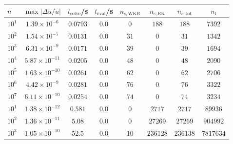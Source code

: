 \begin{tabular}{l c c c c c c c}
\hline \hline 
$n$  &  $\max|\Delta u/u|$  &  $t_{\mathrm{solve}}$/\si{\s}  &  $t_{\mathrm{eval}}$/\si{\s}  &  $n_{\mathrm{s,WKB}}$  &  $n_{\mathrm{s,RK}}$  &  $n_{\mathrm{s,tot}}$  &  $n_{\mathrm{f}}$  \\ \hline
$10^1$  &  $1.39 \times 10^{-6}$  &  $0.0793$  &  $0.0$  &  $0$  &  $188$  &  $188$  &  $7392$  \\ 
$10^2$  &  $1.54 \times 10^{-7}$  &  $0.0131$  &  $0.0$  &  $31$  &  $0$  &  $31$  &  $1342$  \\ 
$10^3$  &  $6.31 \times 10^{-9}$  &  $0.0171$  &  $0.0$  &  $39$  &  $0$  &  $39$  &  $1694$  \\ 
$10^4$  &  $5.87 \times 10^{-11}$  &  $0.0205$  &  $0.0$  &  $48$  &  $0$  &  $48$  &  $2090$  \\ 
$10^5$  &  $1.63 \times 10^{-10}$  &  $0.0261$  &  $0.0$  &  $62$  &  $0$  &  $62$  &  $2706$  \\ 
$10^6$  &  $4.42 \times 10^{-9}$  &  $0.0281$  &  $0.0$  &  $76$  &  $0$  &  $76$  &  $3322$  \\ 
$10^7$  &  $6.11 \times 10^{-10}$  &  $0.0254$  &  $0.0$  &  $74$  &  $0$  &  $74$  &  $3234$  \\ 
\hline \hline
$10^1$  &  $1.38 \times 10^{-12}$  &  $0.581$  &  $0.0$  &  $0$  &  $2717$  &  $2717$  &  $89936$  \\ 
$10^2$  &  $1.36 \times 10^{-11}$  &  $5.08$  &  $0.0$  &  $0$  &  $27269$  &  $27269$  &  $904992$  \\ 
$10^3$  &  $1.05 \times 10^{-10}$  &  $52.5$  &  $0.0$  &  $10$  &  $236128$  &  $236138$  &  $7817634$  \\ 

\end{tabular}
